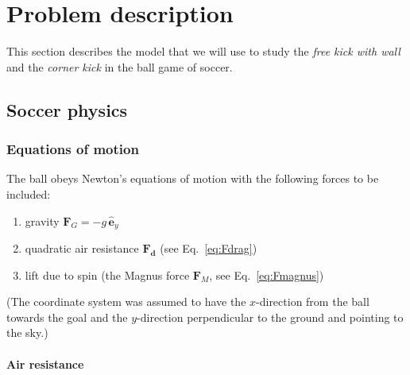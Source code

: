 \documentclass[letterpaper]{scrartcl}
\renewcommand{\vec}[1]{\ensuremath{\mathbf{#1}}}
\begin{document}
\section{Problem description}
\label{sec:problem}

This section describes the model that we will use to study the
\emph{free kick with wall} and the \emph{corner kick} in the ball game
of soccer.

\subsection{Soccer physics}
\label{sec:system}


\subsubsection{Equations of motion}
\label{sec:eom}

The ball obeys Newton's equations of motion with the following
forces to be included:
\begin{enumerate}
\item gravity $\vec{F}_{G} = -g\,\hat{\vec{e}}_{y}$
\item quadratic air resistance $\vec{F_{d}}$ (see
  Eq.~\ref{eq:Fdrag})
\item lift due to spin (the Magnus force $\vec{F}_{M}$, see
  Eq.~\ref{eq:Fmagnus})
\end{enumerate}
(The coordinate system was assumed to have the $x$-direction from the
ball towards the goal and the $y$-direction perpendicular to the
ground and pointing to the sky.)

\paragraph{Air resistance}
\end{document}
